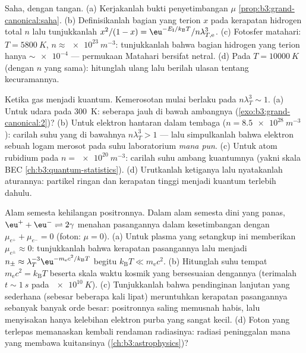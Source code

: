 \begin{exercise}[$\star\star\star$]\label{exo:b3:grand-canonical:10}
Saha, dengan tangan. (a) Kerjakanlah bukti penyetimbangan $\mu$
\cref{prop:b3:grand-canonical:saha}. (b) Definisikanlah bagian yang
terion $x$ pada kerapatan hidrogen total $n$ lalu tunjukkanlah $x^2/(1 - x)
= \eu^{-E_{\text{I}}/k_{\text{B}}T}/n\lambda_{T,\text{e}}^3$. (c)
Fotosfer matahari: $T = \qty{5800}{K}$, $n \approx
\qty{e23}{m^{-3}}$: tunjukkanlah bahwa bagian hidrogen yang terion hanya
$\sim\num{e-4}$ --- permukaan Matahari bersifat netral. (d) Pada $T =
\qty{10000}{K}$ (dengan $n$ yang sama): hitunglah ulang lalu berilah
ulasan tentang kecuramannya.
\end{exercise}

\begin{exercise}[$\star\star\star$]\label{exo:b3:grand-canonical:11}
Ketika gas menjadi kuantum. Kemerosotan mulai berlaku pada $n\lambda_T^3 \sim
1$. (a) Untuk udara pada \qty{300}{K}: seberapa jauh di bawah ambangnya
(\cref{exo:b3:grand-canonical:2})? (b) Untuk elektron hantaran
dalam tembaga ($n = \qty{8.5e28}{m^{-3}}$): carilah suhu yang di
bawahnya $n\lambda_T^3 > 1$ --- lalu simpulkanlah bahwa elektron sebuah
logam merosot pada suhu laboratorium \emph{mana pun}.
(c) Untuk atom rubidium pada $n = \qty{e20}{m^{-3}}$: carilah suhu
ambang kuantumnya (yakni skala BEC
\cref{ch:b3:quantum-statistics}). (d) Urutkanlah ketiganya lalu
nyatakanlah aturannya: partikel ringan dan kerapatan tinggi menjadi
kuantum terlebih dahulu.
\end{exercise}

\begin{exercise}[$\star\star\star$]\label{exo:b3:grand-canonical:12}
Alam semesta kehilangan positronnya. Dalam alam semesta dini yang panas,
$\eu^+ + \eu^- \rightleftharpoons 2\gamma$ menahan pasangannya dalam
kesetimbangan dengan $\mu_{e^+} + \mu_{e^-} = 0$ (foton: $\mu = 0$).
(a) Untuk plasma yang setangkup ini memberikan $\mu_{e^\pm} \approx 0$:
tunjukkanlah bahwa kerapatan pasangannya lalu menjadi $n_\pm \approx
\lambda_T^{-3}\eu^{-m_{\text{e}}c^2/k_{\text{B}}T}$ begitu
$k_{\text{B}}T \ll m_{\text{e}}c^2$. (b) Hitunglah suhu tempat
$m_{\text{e}}c^2 = k_{\text{B}}T$ beserta skala waktu kosmik yang
bersesuaian dengannya (terimalah $t \sim \qty{1}{s}$ pada
$\qty{e10}{K}$). (c) Tunjukkanlah bahwa pendinginan lanjutan yang
sederhana (sebesar beberapa kali lipat) meruntuhkan kerapatan
pasangannya sebanyak banyak orde besar: positronnya saling memusnah
habis, lalu menyisakan hanya kelebihan elektron purba yang sangat kecil.
(d) Foton yang terlepas memanaskan kembali rendaman radiasinya: radiasi
peninggalan mana yang membawa kuitansinya
(\cref{ch:b3:astrophysics})?
\end{exercise}

